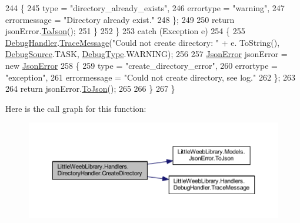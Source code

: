 \begin{DoxyCode}
244                     \{
245                         type = \textcolor{stringliteral}{"directory\_already\_exists"},
246                         errortype = \textcolor{stringliteral}{"warning"},
247                         errormessage = \textcolor{stringliteral}{"Directory already exist."}
248                     \};
249 
250                     \textcolor{keywordflow}{return} jsonError.\mbox{\hyperlink{class_little_weeb_library_1_1_models_1_1_json_error_a0e3e7dd2e2990404b7f0461742b23440}{ToJson}}();
251                 \}
252             \}
253             \textcolor{keywordflow}{catch} (Exception e)
254             \{
255                 \mbox{\hyperlink{class_little_weeb_library_1_1_handlers_1_1_directory_handler_adb882b8ec72046e2b95b6d11228f6927}{DebugHandler}}.\mbox{\hyperlink{interface_little_weeb_library_1_1_handlers_1_1_i_debug_handler_a2e405bc3492e683cd3702fae125221bc}{TraceMessage}}(\textcolor{stringliteral}{"Could not create directory: "} + e.
      ToString(), \mbox{\hyperlink{namespace_little_weeb_library_1_1_handlers_a2a6ca0775121c9c503d58aa254d292be}{DebugSource}}.TASK, \mbox{\hyperlink{namespace_little_weeb_library_1_1_handlers_ab66019ed40462876ec4e61bb3ccb0a62}{DebugType}}.WARNING);
256 
257                 \mbox{\hyperlink{class_little_weeb_library_1_1_models_1_1_json_error}{JsonError}} jsonError = \textcolor{keyword}{new} \mbox{\hyperlink{class_little_weeb_library_1_1_models_1_1_json_error}{JsonError}}
258                 \{
259                     type = \textcolor{stringliteral}{"create\_directory\_error"},
260                     errortype = \textcolor{stringliteral}{"exception"},
261                     errormessage = \textcolor{stringliteral}{"Could not  create directory, see log."}
262                 \};
263 
264                 \textcolor{keywordflow}{return} jsonError.\mbox{\hyperlink{class_little_weeb_library_1_1_models_1_1_json_error_a0e3e7dd2e2990404b7f0461742b23440}{ToJson}}();
265 
266             \}
267         \}
\end{DoxyCode}
Here is the call graph for this function\+:\nopagebreak
\begin{figure}[H]
\begin{center}
\leavevmode
\includegraphics[width=350pt]{class_little_weeb_library_1_1_handlers_1_1_directory_handler_a6be1b158ee280e8a74a49917a90484e2_cgraph}
\end{center}
\end{figure}
